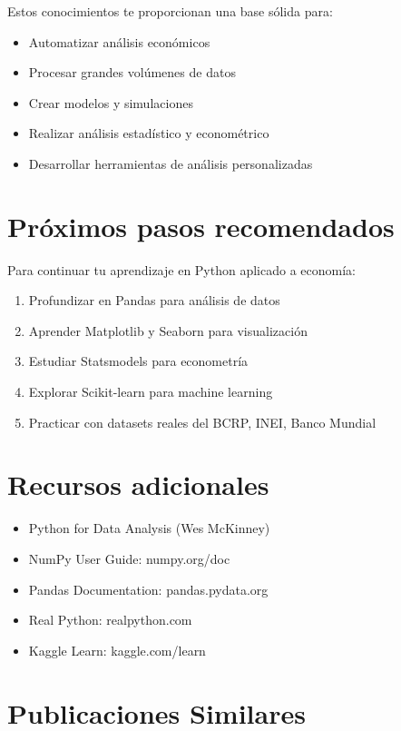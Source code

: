 \documentclass[
  doc,
  floatsintext,
  longtable,
  a4paper,
  nolmodern,
  notxfonts,
  notimes,
  12pt,
  colorlinks=true,linkcolor=blue,citecolor=blue,urlcolor=blue]{apa7}
\providecommand{\tightlist}{%
  \setlength{\itemsep}{0pt}\setlength{\parskip}{0pt}}
\begin{document}
Estos conocimientos te proporcionan una base sólida para:

\begin{itemize}
\tightlist
\item
  Automatizar análisis económicos
\item
  Procesar grandes volúmenes de datos
\item
  Crear modelos y simulaciones
\item
  Realizar análisis estadístico y econométrico
\item
  Desarrollar herramientas de análisis personalizadas
\end{itemize}

\section{Próximos pasos
recomendados}\label{pruxf3ximos-pasos-recomendados}

Para continuar tu aprendizaje en Python aplicado a economía:

\begin{enumerate}
\def\labelenumi{\arabic{enumi}.}
\tightlist
\item
  Profundizar en Pandas para análisis de datos
\item
  Aprender Matplotlib y Seaborn para visualización
\item
  Estudiar Statsmodels para econometría
\item
  Explorar Scikit-learn para machine learning
\item
  Practicar con datasets reales del BCRP, INEI, Banco Mundial
\end{enumerate}

\section{Recursos adicionales}\label{recursos-adicionales}

\begin{itemize}
\tightlist
\item
  Python for Data Analysis (Wes McKinney)
\item
  NumPy User Guide: numpy.org/doc
\item
  Pandas Documentation: pandas.pydata.org
\item
  Real Python: realpython.com
\item
  Kaggle Learn: kaggle.com/learn
\end{itemize}

\section{Publicaciones Similares}\label{publicaciones-similares}
\end{document}
